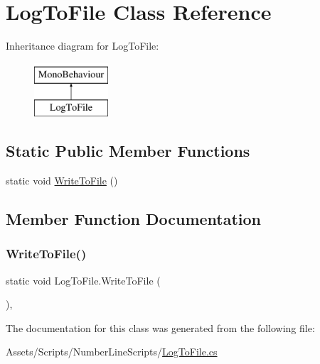 \hypertarget{classLogToFile}{}\section{Log\+To\+File Class Reference}
\label{classLogToFile}
Inheritance diagram for Log\+To\+File\+:\begin{figure}[H]
\begin{center}
\leavevmode
\includegraphics[height=2.000000cm]{classLogToFile}
\end{center}
\end{figure}
\subsection*{Static Public Member Functions}
\begin{DoxyCompactItemize}
\item 
static void \hyperlink{classLogToFile_a6ee6a535dd3afdc95f855ff3727fc674}{Write\+To\+File} ()
\end{DoxyCompactItemize}


\subsection{Member Function Documentation}
\mbox{\label{classLogToFile_a6ee6a535dd3afdc95f855ff3727fc674}} 
\subsubsection{\texorpdfstring{Write\+To\+File()}{WriteToFile()}}
{\footnotesize\ttfamily static void Log\+To\+File.\+Write\+To\+File (\begin{DoxyParamCaption}{ }\end{DoxyParamCaption})\hspace{0.3cm}{\ttfamily [inline]}, {\ttfamily [static]}}



The documentation for this class was generated from the following file\+:\begin{DoxyCompactItemize}
\item 
Assets/\+Scripts/\+Number\+Line\+Scripts/\hyperlink{LogToFile_8cs}{Log\+To\+File.\+cs}\end{DoxyCompactItemize}

